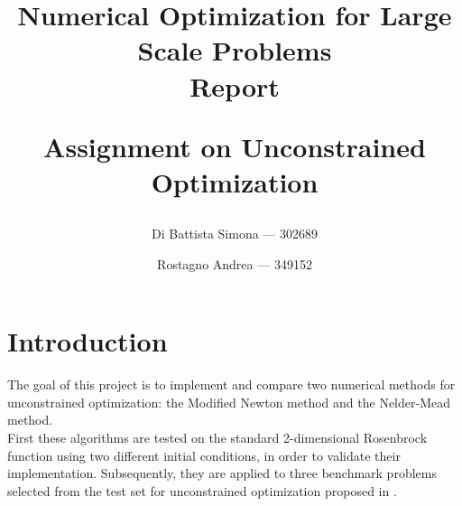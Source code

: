 \documentclass[a4paper,12pt]{article}
\begin{document}
	
	\title{\textbf{Numerical Optimization for Large Scale Problems}\\
	\vspace{0.5em}\huge\textbf{Report}
	\author{
		Di Battista Simona — 302689%
		\and
		Rostagno Andrea — 349152\\
			}
	
	\vspace{0.5cm}
	\large Assignment on Unconstrained Optimization}
	\maketitle
	\thispagestyle{empty}   %
	\newpage                %
	
	\tableofcontents
	\newpage                %
	
	
	\section{Introduction}
	
	The goal of this project is to implement and compare two numerical methods for unconstrained optimization: the Modified Newton method and the Nelder-Mead method. \\
	
	First these algorithms are tested on the standard 2-dimensional Rosenbrock function using two different initial conditions, in order to validate their implementation. Subsequently, they are applied to three benchmark problems selected from the test set for unconstrained optimization proposed in \cite{luksan1999}. \\
	
\end{document}
